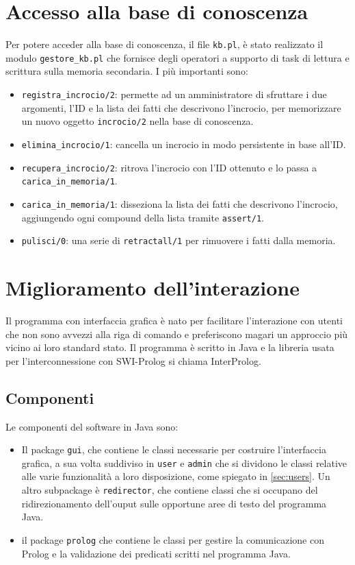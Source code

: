 \section{Accesso alla base di conoscenza}
Per potere acceder alla base di conoscenza, il file \texttt{kb.pl}, è stato realizzato il modulo \texttt{gestore\_kb.pl} che fornisce degli operatori a supporto di task di lettura e scrittura sulla memoria secondaria. I più importanti sono:
\begin{itemize}
	\item \texttt{registra\_incrocio/2}: permette ad un amministratore di sfruttare i due argomenti, l'ID e la lista dei fatti che descrivono l'incrocio, per memorizzare un nuovo oggetto \texttt{incrocio/2} nella base di conoscenza.
	\item \texttt{elimina\_incrocio/1}: cancella un incrocio in modo persistente in base all'ID.
	\item \texttt{recupera\_incrocio/2}: ritrova l'incrocio con l'ID ottenuto e lo passa a \texttt{carica\_in\_memoria/1}.
	\item \texttt{carica\_in\_memoria/1}: disseziona la lista dei fatti che descrivono l'incrocio, aggiungendo ogni compound della lista tramite \texttt{assert/1}.
	\item \texttt{pulisci/0}: una serie di \texttt{retractall/1} per rimuovere i fatti dalla memoria.
\end{itemize}

\section{Miglioramento dell'interazione}
Il programma con interfaccia grafica è nato per facilitare l'interazione con utenti che non sono avvezzi alla riga di comando e preferiscono magari un approccio più vicino ai loro standard stato. Il programma è scritto in Java e la libreria usata per l'interconnessione con SWI-Prolog si chiama InterProlog.

\subsection{Componenti}
Le componenti del software in Java sono:

\begin{itemize}
	\item Il package \texttt{gui}, che contiene le classi necessarie per costruire l'interfaccia grafica, a sua volta suddiviso in \texttt{user} e \texttt{admin} che si dividono le classi relative alle varie funzionalità a loro disposizione, come spiegato in \ref{sec:users}. Un altro subpackage è \texttt{redirector}, che contiene classi che si occupano del ridirezionamento dell'ouput sulle opportune aree di testo del programma Java.
	\item il package \texttt{prolog} che contiene le classi per gestire la comunicazione con Prolog e la validazione dei predicati scritti nel programma Java.
\end{itemize}

